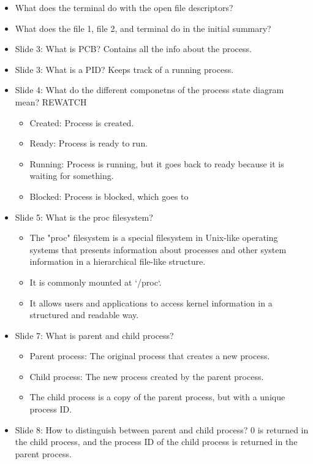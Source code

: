 \begin{faq}
    \begin{itemize}
        \item What does the terminal do with the open file descriptors?
        \item What does the file 1, file 2, and terminal do in the initial summary? 
        \item Slide 3: What is PCB? Contains all the info about the process.
        \item Slide 3: What is a PID? Keeps track of a running process.
        \item Slide 4: What do the different componetns of the process state diagram mean? REWATCH
        \begin{itemize}
            \item Created: Process is created.
            \item Ready: Process is ready to run.
            \item Running: Process is running, but it goes back to ready because it is waiting for something.
            \item Blocked: Process is blocked, which goes to 
        \end{itemize}
        \item Slide 5: What is the proc filesystem?
        \begin{itemize}
            \item The "proc" filesystem is a special filesystem in Unix-like operating systems that presents information about processes and other system information in a hierarchical file-like structure.
            \item It is commonly mounted at `/proc`.
            \item It allows users and applications to access kernel information in a structured and readable way.
        \end{itemize}
        \item Slide 7: What is parent and child process?
        \begin{itemize}
            \item Parent process: The original process that creates a new process.
            \item Child process: The new process created by the parent process.
            \item The child process is a copy of the parent process, but with a unique process ID.
        \end{itemize}
        \item Slide 8: How to distinguish between parent and child process? 0 is returned in the child process, and the process ID of the child process is returned in the parent process.

\end{itemize}
\end{faq}
